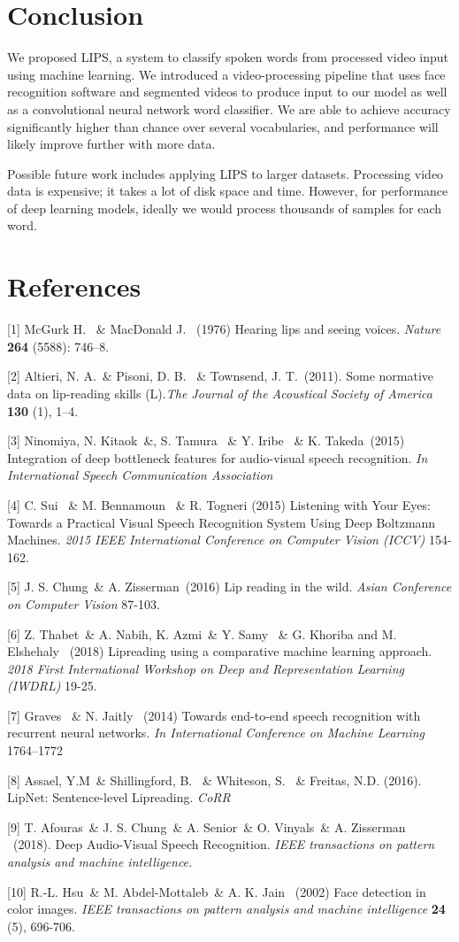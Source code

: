 \documentclass{article}
\begin{document}
\section{Conclusion}

We proposed LIPS, a system to classify spoken words from processed video input using machine learning. We introduced a video-processing pipeline that uses face recognition software and segmented videos to produce input to our model as well as a convolutional neural network word classifier. We are able to achieve accuracy significantly higher than chance over several vocabularies, and performance will likely improve further with more data. 

Possible future work includes applying LIPS to larger datasets. Processing video data is expensive; it takes a lot of disk space and time. However, for performance of deep learning models, ideally we would process thousands of samples for each word.

\section*{References}
\small

[1] McGurk H. \ \& MacDonald J. \ (1976) Hearing lips and seeing voices. {\it Nature} {\bf 264} (5588): 746–8.

[2] Altieri, N. A.\ \& Pisoni, D. B. \ \& Townsend, J. T.\  (2011). Some normative data on lip-reading skills (L).{\it The Journal of the Acoustical Society of America}  {\bf 130} (1), 1–4.

[3]  Ninomiya, N. Kitaok\ \&, S. Tamura \ \& Y. Iribe \ \&  K. Takeda\ (2015) Integration of deep bottleneck features for audio-visual speech recognition. {\it In International Speech Communication Association}

[4] C. Sui \ \& M. Bennamoun \ \& R. Togneri (2015) Listening with Your Eyes: Towards a Practical Visual Speech Recognition System Using Deep Boltzmann Machines. {\it 2015 IEEE International Conference on Computer Vision (ICCV)} 154-162.

[5] J. S. Chung\ \& A. Zisserman\ (2016) Lip reading in the wild. {\it Asian Conference on Computer Vision} 87-103.

[6] Z. Thabet\ \& A. Nabih, K. Azmi\ \& Y. Samy \ \& G. Khoriba and M. Elshehaly \ (2018) Lipreading using a comparative machine learning approach. {\it 2018 First International Workshop on Deep and Representation Learning (IWDRL)} 19-25.

[7]  Graves \ \& N. Jaitly \ (2014) Towards end-to-end speech recognition with recurrent neural networks. {\it In International Conference on Machine Learning} 1764–1772

[8] Assael, Y.M\ \& Shillingford, B. \ \& Whiteson, S. \ \& Freitas, N.D. (2016). LipNet: Sentence-level Lipreading. {\it CoRR}

[9] T. Afouras\ \& J. S. Chung\ \& A. Senior\ \& O. Vinyals\ \& A. Zisserman \ (2018). Deep Audio-Visual Speech Recognition. {\it IEEE transactions on pattern analysis and machine intelligence.}

[10] R.-L. Hsu\ \& M. Abdel-Mottaleb\ \& A. K. Jain \ (2002) Face detection in color images. {\it IEEE transactions on pattern analysis and machine intelligence} {\bf 24} (5), 696-706.
\end{document}
